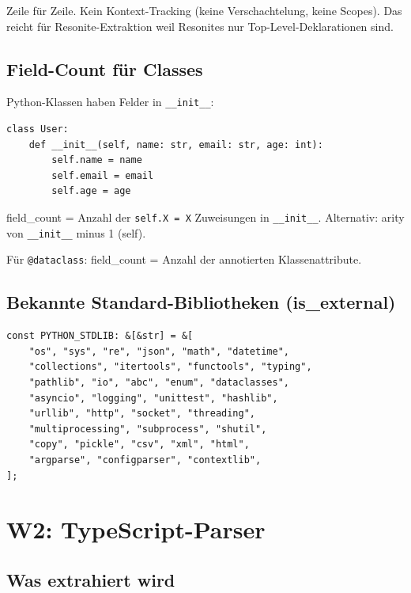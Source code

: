 \documentclass[11pt,a4paper]{article}
\begin{document}
Zeile f\"ur Zeile. Kein Kontext-Tracking (keine Verschachtelung, 
keine Scopes). Das reicht f\"ur Resonite-Extraktion weil 
Resonites nur Top-Level-Deklarationen sind.

\subsection{Field-Count f\"ur Classes}

Python-Klassen haben Felder in \texttt{\_\_init\_\_}:

\begin{lstlisting}[style=bash]
class User:
    def __init__(self, name: str, email: str, age: int):
        self.name = name
        self.email = email
        self.age = age
\end{lstlisting}

field\_count = Anzahl der \texttt{self.X = X} Zuweisungen 
in \texttt{\_\_init\_\_}. Alternativ: arity von 
\texttt{\_\_init\_\_} minus 1 (self).

F\"ur \texttt{@dataclass}: field\_count = Anzahl der 
annotierten Klassenattribute.

\subsection{Bekannte Standard-Bibliotheken (is\_external)}

\begin{lstlisting}[style=rust]
const PYTHON_STDLIB: &[&str] = &[
    "os", "sys", "re", "json", "math", "datetime",
    "collections", "itertools", "functools", "typing",
    "pathlib", "io", "abc", "enum", "dataclasses",
    "asyncio", "logging", "unittest", "hashlib",
    "urllib", "http", "socket", "threading",
    "multiprocessing", "subprocess", "shutil",
    "copy", "pickle", "csv", "xml", "html",
    "argparse", "configparser", "contextlib",
];
\end{lstlisting}


\section{W2: TypeScript-Parser}
\label{sec:typescript}

\subsection{Was extrahiert wird}
\end{document}
